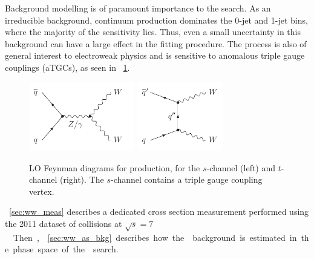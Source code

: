 
Background modelling is of paramount importance to the \HWW search. As an irreducible 
background, continuum \WWlvlv production dominates the 0-jet and 1-jet bins, where the 
majority of the sensitivity lies. Thus, even a small uncertainty in this background can 
have a large effect in the fitting procedure. The process is also of general interest to 
electroweak physics and is sensitive to anomalous triple gauge couplings (aTGCs), as seen 
in \Figure~\ref{fig:WW:feyn}.

\begin{figure}[b]
	\null\hfill
	\includegraphics[height=3cm]{axodraw/WW_schannel.pdf}
	\hfill
	\includegraphics[height=3cm]{axodraw/WW_tchannel.pdf}
	\hfill\null
	\caption{LO Feynman diagrams for \WW production, for the $s$-channel (left) and 
	$t$-channel (right). The $s$-channel contains a triple gauge coupling vertex.}
	\label{fig:WW:feyn}
\end{figure}

\Section~\ref{sec:ww_meas} describes a dedicated \WW cross section measurement performed 
using the 2011 dataset of \pp collisions at \unit{$\sqrt{s} = 7$}{\TeV}. Then, 
\Section~\ref{sec:ww_as_bkg} describes how the \WW background is estimated in the phase 
space of the \HWW search.

